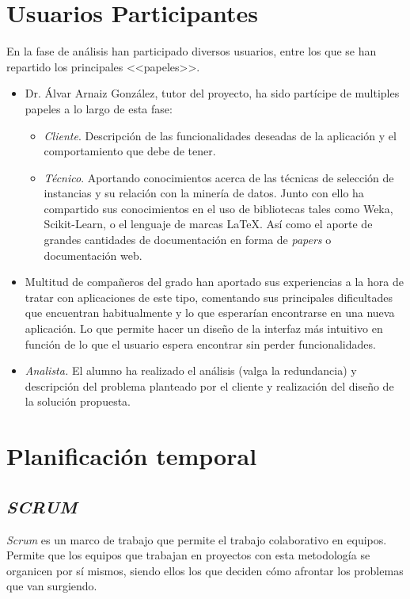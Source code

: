 \section{Usuarios Participantes}\label{usuarios-participantes}
En la fase de análisis han participado diversos usuarios, entre los que se han repartido los principales <<papeles>>.
\begin{itemize}
\item Dr. Álvar Arnaiz González, tutor del proyecto, ha sido partícipe de multiples papeles a lo largo de esta fase:
\begin{itemize}
\item \textit{Cliente}. Descripción de las funcionalidades deseadas de la aplicación y el comportamiento que debe de tener.
\item \textit{Técnico}. Aportando conocimientos acerca de las técnicas de selección de instancias y su relación con la minería de datos. Junto con ello ha compartido sus conocimientos en el uso de bibliotecas tales como Weka, Scikit-Learn, o el lenguaje de marcas \LaTeX. Así como el aporte de grandes cantidades de documentación en forma de \textit{papers} o documentación web. 
\end{itemize}
\item Multitud de compañeros del grado han aportado sus experiencias a la hora de tratar con aplicaciones de este tipo, comentando sus principales dificultades que encuentran habitualmente y lo que esperarían encontrarse en una nueva aplicación. Lo que permite hacer un diseño de la interfaz más intuitivo en función de lo que el usuario espera encontrar sin perder funcionalidades.
\item \textit{Analista.} El alumno ha realizado el análisis (valga la redundancia) y descripción del problema planteado por el cliente y realización del diseño de la solución propuesta.
\end{itemize}

\section{Planificación temporal}
\subsection{\textit{SCRUM}}
\textit{Scrum} es un marco de trabajo que permite el trabajo colaborativo en equipos. Permite que los equipos que trabajan en proyectos con esta metodología se organicen por sí mismos, siendo ellos los que deciden cómo afrontar los problemas que van surgiendo. 

